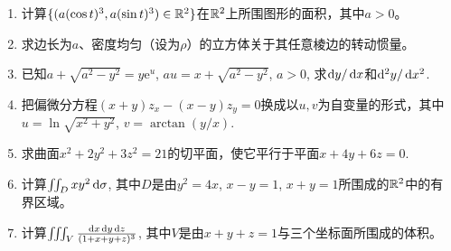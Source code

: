 \begin{enumerate}
    \item 计算$\{(a(\cos t)^3, a(\sin t)^3)\in \mathbb{R}^2\}$在$\mathbb{R}^2$上所围图形的面积，其中$a>0$。
    \item 求边长为$a$、密度均匀（设为$\rho$）的立方体关于其任意棱边的转动惯量。
    \item 已知$a+\sqrt{a^2-y^2}=y\mathrm{e}^u$, $au=x+\sqrt{a^2-y^2}$, $a>0$, 求$\mathop{}\!\mathrm{d} y/\mathop{}\!\mathrm{d} x$和$\mathop{}\!\mathrm{d}^2 y/\mathop{}\!\mathrm{d} x^2$.
    \item 把偏微分方程$(x+y)z_x-(x-y)z_y=0$换成以$u,v$为自变量的形式，其中$u=\ln\sqrt{x^2+y^2}$, $v=\arctan (y/x)$.
    \item 求曲面$x^2+2y^2+3z^2=21$的切平面，使它平行于平面$x+4y+6z=0$.
    \item 计算$\iint_D xy^2 \mathop{}\!\mathrm{d}\sigma$, 其中$D$是由$y^2=4x$, $x-y=1$, $x+y=1$所围成的$\mathbb{R}^2$中的有界区域。
    \item 计算$\iiint_V \frac{\mathop{}\!\mathrm{d} x\mathop{}\!\mathrm{d} y\mathop{}\!\mathrm{d} z}{(1+x+y+z)^3}$, 其中$V$是由$x+y+z=1$与三个坐标面所围成的体积。
\end{enumerate}